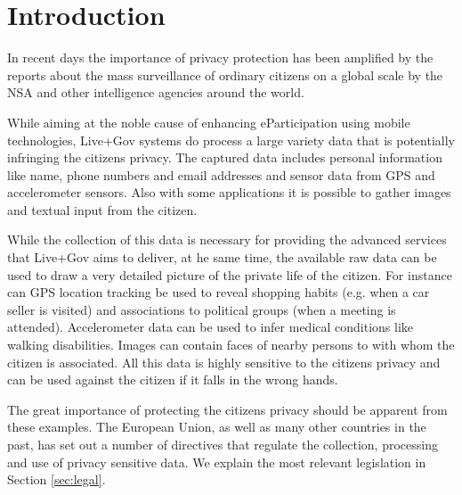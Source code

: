\documentclass[external]{20120615_deliverable_template_ukob}
\theoremstyle{definition}
\begin{document}

\setcounter{tocdepth}{2}

\LGTOC

\newpage
\newcommand{\todo}[2]{\textcolor{magenta}{#1: #2}}

\chapter{Introduction}\label{chap:Introduction}
In recent days the importance of privacy protection has been amplified
by the reports about the mass surveillance of ordinary citizens on a
global scale by the NSA and other intelligence agencies around the
world.

While aiming at the noble cause of enhancing eParticipation using
mobile technologies, Live+Gov systems do process a large variety data
that is potentially infringing the citizens privacy. The captured data
includes personal information like name, phone numbers and email
addresses and sensor data from GPS and accelerometer sensors. Also
with some applications it is possible to gather images and textual
input from the citizen.

While the collection of this data is necessary for providing the
advanced services that Live+Gov aims to deliver, at he same time, the
available raw data can be used to draw a very detailed picture of the
private life of the citizen. For instance can GPS location tracking be
used to reveal shopping habits (e.g. when a car seller is visited) and
associations to political groups (when a meeting is
attended). Accelerometer data can be used to infer medical conditions
like walking disabilities. Images can contain faces of nearby persons
to with whom the citizen is associated. All this data is highly
sensitive to the citizens privacy and can be used against the citizen
if it falls in the wrong hands.

The great importance of protecting the citizens privacy should be
apparent from these examples. The European Union, as well as many
other countries in the past, has set out a number of directives that
regulate the collection, processing and use of privacy sensitive
data. We explain the most relevant legislation in Section
\ref{sec:legal}.
\end{document}
